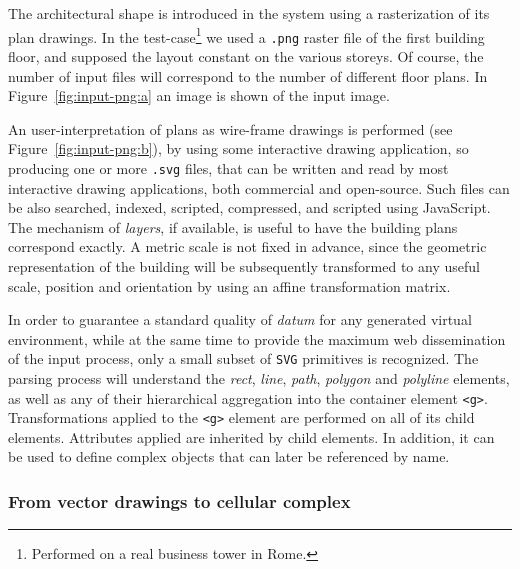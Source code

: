 \documentclass[]{egpubl}
\begin{document}
The architectural shape is introduced in the system using a rasterization of its plan drawings.
In the test-case\footnote{Performed on a real business tower in Rome.} we used a \texttt{.png} raster file of the first building floor, and supposed the layout constant on the various storeys. Of course, the number of input files will correspond to the number of different floor plans. In Figure~\ref{fig:input-png:a} an image is shown of the input image.

An user-interpretation of plans as wire-frame drawings is performed (see Figure~\ref{fig:input-png:b}), by using some interactive drawing application, so producing one or more \texttt{.svg} files, that can be written and read by most
interactive drawing applications, both commercial and open-source. Such
files can be also searched, indexed, scripted, compressed, and scripted  using JavaScript. The mechanism of \emph{layers}, if available, is useful to have the building plans correspond exactly. A metric scale is not fixed in advance, since the geometric representation of the building will be subsequently transformed to any useful scale, position and orientation by using an affine transformation matrix.

In order to guarantee a standard quality of \emph{datum} for any generated
virtual environment, while at the same time to provide the maximum web 
dissemination of the input process, only a small subset of
\texttt{SVG} primitives is recognized. The
parsing process will understand the \emph{rect}, \emph{line}, \emph{path}, \emph{polygon} and \emph{polyline} elements, as well as any of
their hierarchical aggregation into the container element
\texttt{\textless{}g\textgreater{}}. Transformations applied to the
\texttt{\textless{}g\textgreater{}} element are performed on all of its
child elements. Attributes applied are inherited by child elements. In
addition, it can be used to define complex objects that can later be
referenced by name.




\subsubsection*{From vector drawings to cellular complex}
\end{document}
